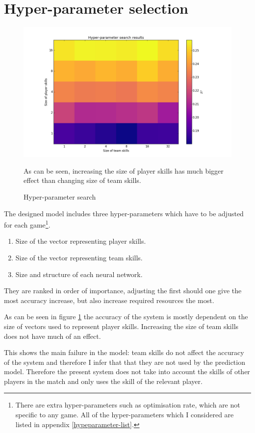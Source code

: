 \documentclass[12pt,a4paper]{book}
\newcommand\note[1]{\vspace*{-0.5\baselineskip}\caption*{#1}}
\begin{document}
\section{Hyper-parameter selection}
\begin{figure}[ht]
\centering
\includegraphics[scale=0.5]{hyper-parameter-search}
\caption{Hyper-parameter search}
\note{As can be seen, increasing the size of player skills has much bigger effect than changing size of team skills.}
\label{fig:hyper-parameter-search}
\end{figure}
The designed model includes three hyper-parameters which have to be adjusted for each game\footnote{There are extra hyper-parameters such as optimisation rate, which are not specific to any game. 
All of the hyper-parameters which I considered are listed in appendix  \ref{hypeparameter-list}.}.
\begin{enumerate}
\item Size of the vector representing player skills.
\item Size of the vector representing team skills.
\item Size and structure of each neural network.
\end{enumerate}
They are ranked in order of importance, adjusting the first should one give the most accuracy increase, but also increase required resources the most.

As can be seen in figure \ref{fig:hyper-parameter-search} the accuracy of the system is mostly dependent on the size of vectors used to represent player skills.
Increasing the size of team skills does not have much of an effect.

This shows the main failure in the model: team skills do not affect the accuracy of the system and therefore I infer that that they are not used by the prediction model.
Therefore the present system does not take into account the skills of other players in the match and only uses the skill of the relevant player.
\end{document}
